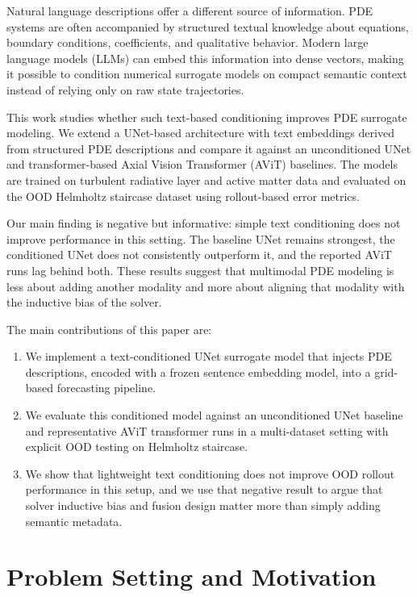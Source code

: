 \documentclass[
]{article}
\providecommand{\tightlist}{%
  \setlength{\itemsep}{0pt}\setlength{\parskip}{0pt}}
\begin{document}
Natural language descriptions offer a different source of information.
PDE systems are often accompanied by structured textual knowledge about
equations, boundary conditions, coefficients, and qualitative behavior.
Modern large language models (LLMs) can embed this information into
dense vectors, making it possible to condition numerical surrogate
models on compact semantic context instead of relying only on raw state
trajectories.

This work studies whether such text-based conditioning improves PDE
surrogate modeling. We extend a UNet-based architecture with text
embeddings derived from structured PDE descriptions and compare it
against an unconditioned UNet and transformer-based Axial Vision
Transformer (AViT) baselines. The models are trained on turbulent
radiative layer and active matter data and evaluated on the OOD
Helmholtz staircase dataset using rollout-based error metrics.

Our main finding is negative but informative: simple text conditioning
does not improve performance in this setting. The baseline UNet remains
strongest, the conditioned UNet does not consistently outperform it, and
the reported AViT runs lag behind both. These results suggest that
multimodal PDE modeling is less about adding another modality and more
about aligning that modality with the inductive bias of the solver.

The main contributions of this paper are:

\begin{enumerate}
\def\labelenumi{\arabic{enumi}.}
\tightlist
\item
  We implement a text-conditioned UNet surrogate model that injects PDE
  descriptions, encoded with a frozen sentence embedding model, into a
  grid-based forecasting pipeline.
\item
  We evaluate this conditioned model against an unconditioned UNet
  baseline and representative AViT transformer runs in a multi-dataset
  setting with explicit OOD testing on Helmholtz staircase.
\item
  We show that lightweight text conditioning does not improve OOD
  rollout performance in this setup, and we use that negative result to
  argue that solver inductive bias and fusion design matter more than
  simply adding semantic metadata.
\end{enumerate}

\section{Problem Setting and
Motivation}\label{problem-setting-and-motivation}
\end{document}
